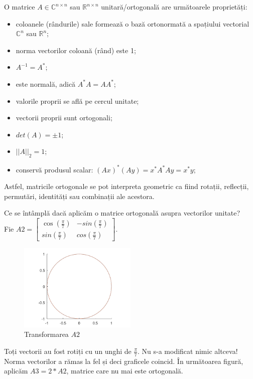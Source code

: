 \documentclass{exam}
\begin{document}
O matrice $A \in \mathbb{C}^{n \times n}$ sau $\mathbb{R}^{n \times n}$
unitară/ortogonală are următoarele proprietăți:

\begin{itemize}
	\item coloanele (rândurile) sale formează o bază ortonormată a spațiului
	      vectorial $\mathbb{C}^n$ sau $\mathbb{R}^n$;
	\item norma vectorilor coloană (rând) este 1;
	\item $A^{-1} = A^*$;
	\item este normală, adică $A^*A = AA^*$;
	\item valorile proprii se află pe cercul unitate;
	\item vectorii proprii sunt ortogonali;
	\item $det(A) = \pm 1$;
	\item $||A||_2 = 1$;
	\item conservă produsul scalar: $(Ax)^*(Ay) = x^*A^*Ay = x^*y$;
\end{itemize}

Astfel, matricile ortogonale se pot interpreta geometric ca fiind rotații,
reflecții, permutări, identități sau combinații ale acestora.

Ce se întâmplă dacă aplicăm o matrice ortogonală asupra vectorilor unitate? \\
Fie $A2 = \begin{bmatrix} \cos(\frac{\pi}{7}) & -sin(\frac{\pi}{7}) \\ sin(\frac{\pi}{7}) & cos(\frac{\pi}{7}) \end{bmatrix}$.

\begin{figure}[ht]
	\centering
	\includegraphics[width=0.5\textwidth]{plot3}
	\caption{Transformarea $A2$}
	\label{fig:3}
\end{figure}

\newpage
Toți vectorii au fost rotiți cu un unghi de $\frac{\pi}{7}$. Nu s-a
modificat nimic altceva! Norma vectorilor a rămas la fel și deci graficele
coincid. În următoarea figură, aplicăm $A3 = 2 * A2$, matrice care nu mai este
ortogonală.
\end{document}
